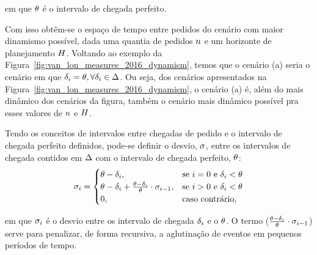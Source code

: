 \noindent em que $\theta$ é o intervalo de chegada perfeito.

Com isso obtêm-se o espaço de tempo entre pedidos do cenário com maior
dinamismo possível, dada uma quantia de pedidos $n$ 
e um horizonte de planejamento $H$.
Voltando ao exemplo da Figura~\ref{fig:van_lon_measures_2016_dynamism},
temos que o cenário (a) seria o cenário em que
$\delta_i = \theta, \forall
\delta_i \in \Delta$.
Ou seja, dos cenários apresentados na 
Figura~\ref{fig:van_lon_measures_2016_dynamism}, o cenário (a) é, além do mais
dinâmico dos cenários da figura, também o cenário mais dinâmico possível pra
esses valores de $n$ e $H$.

Tendo os conceitos de intervalos entre chegadas de pedido e o intervalo de
chegada perfeito definidos, pode-se definir o desvio,
$\sigma$, entre os intervalos de chegada contidos em
$\Delta$ com o intervalo de chegada perfeito,
$\theta$:
%
\begin{equation}
    \sigma_i =
        \begin{cases}
            \theta - \delta_i,
            & \text{se $i = 0$ 
                    e $\delta_i < \theta$} \\
            \theta - \delta_i 
            + \frac{\theta-\delta_i}
                   {\theta}
            \cdot \sigma_{i-1},
            & \text{se $i > 0$ 
                    e $\delta_i < \theta$} \\
            0, & \text{caso contrário},
        \end{cases}
    \label{eq:van_lon_measures_2016_deviationFromPerfectInterval}
\end{equation}

\noindent em que $\sigma_i$ é o desvio entre os intervalo 
de chegada $\delta_i$ e o $\theta$. O
termo ($\frac{\theta-\delta_i}
{\theta} \cdot \sigma_{i-1}$) serve para 
penalizar, de forma recursiva, a aglutinação de eventos em pequenos 
períodos de tempo.


